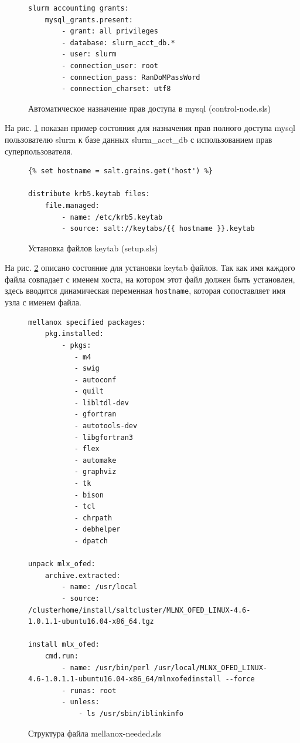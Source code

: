 \documentclass[a4paper]{extarticle}
\begin{document}
\begin{figure}[H]
\begin{verbatim}
slurm accounting grants:
    mysql_grants.present:
        - grant: all privileges
        - database: slurm_acct_db.*
        - user: slurm
        - connection_user: root
        - connection_pass: RanDoMPassWord
        - connection_charset: utf8
\end{verbatim}
\captionsetup{labelfont=bf, labelsep=space}
\caption{Автоматическое назначение прав доступа в mysql (control-node.sls)}
\label{fig:mysqldb}
\end{figure}

На рис. \ref{fig:mysqldb} показан пример состояния для назначения прав полного доступа mysql пользователю slurm к базе данных slurm\_acct\_db с использованием прав суперпользователя.

\begin{figure}[H]
\begin{verbatim}
{% set hostname = salt.grains.get('host') %}

distribute krb5.keytab files:
    file.managed:
        - name: /etc/krb5.keytab
        - source: salt://keytabs/{{ hostname }}.keytab
\end{verbatim}
\captionsetup{labelfont=bf, labelsep=space}
\caption{Установка файлов keytab (setup.sls)}
\label{fig:keytabs}
\end{figure}

На рис. \ref{fig:keytabs} описано состояние для установки keytab файлов. Так как имя каждого файла совпадает с именем хоста, на котором этот файл должен быть установлен, здесь вводится
динамическая переменная \texttt{hostname}, которая сопоставляет имя узла с именем файла.

\begin{figure}[H]
\begin{verbatim}
mellanox specified packages:
    pkg.installed:
        - pkgs:
           - m4 
           - swig
           - autoconf
           - quilt
           - libltdl-dev
           - gfortran 
           - autotools-dev
           - libgfortran3
           - flex
           - automake
           - graphviz
           - tk
           - bison
           - tcl
           - chrpath
           - debhelper
           - dpatch

unpack mlx_ofed:
    archive.extracted:
        - name: /usr/local
        - source: /clusterhome/install/saltcluster/MLNX_OFED_LINUX-4.6-1.0.1.1-ubuntu16.04-x86_64.tgz

install mlx_ofed:
    cmd.run:
        - name: /usr/bin/perl /usr/local/MLNX_OFED_LINUX-4.6-1.0.1.1-ubuntu16.04-x86_64/mlnxofedinstall --force
        - runas: root
        - unless:
            - ls /usr/sbin/iblinkinfo
\end{verbatim}
\captionsetup{labelfont=bf, labelsep=space}
\caption{Структура файла mellanox-needed.sls}
\label{fig:ofed}
\end{figure}
\end{document}
